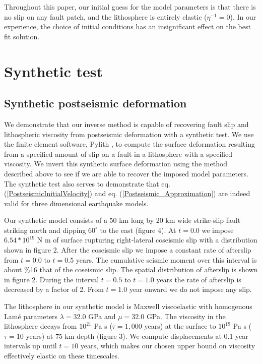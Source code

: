\documentclass[12pt]{article}
\begin{document}
Throughout this paper, our initial guess for the model parameters is
that there is no slip on any fault patch, and the lithosphere is
entirely elastic ($\eta^{-1} = 0$).  In our experience, the choice of
initial conditions has an insignificant effect on the best fit
solution.

\section{Synthetic test}
\subsection{Synthetic postseismic deformation}

We demonstrate that our inverse method is capable of recovering fault
slip and lithospheric viscosity from postseismic deformation with a
synthetic test.  We use the finite element software, Pylith
\citep{A2007}, to compute the surface deformation resulting from a
specified amount of slip on a fault in a lithosphere with a specified
viscosity.  We invert this synthetic surface deformation using the
method described above to see if we are able to recover the imposed
model parameters.  The synthetic test also serves to demonstrate that
eq. (\ref{PostseismicInitialVelocity}) and
eq. (\ref{Postseismic_Approximation}) are indeed valid for three
dimensional earthquake models.

Our synthetic model consists of a 50 km long by 20 km wide strike-slip
fault striking north and dipping $60^{\circ}$ to the east (figure
4). At $t=0.0$ we impose $6.54*10^{19}$ N m of
surface rupturing right-lateral coseismic slip with a distribution
shown in figure 2.  After the coseismic slip we impose a constant rate
of afterslip from $t=0.0$ to $t=0.5$ years.  The cumulative seismic
moment over this interval is about \%16 that of the coseismic slip.
The spatial distribution of afterslip is shown in figure 2.  During
the interval $t=0.5$ to $t=1.0$ years the rate of afterslip is
decreased by a factor of 2.  From $t=1.0$ year onward we do not impose any
slip.

The lithosphere in our synthetic model is Maxwell viscoelastic with
homogenous Lam\'e parameters $\lambda = 32.0$ GPa and $\mu = 32.0$
GPa.  The viscosity in the lithosphere decays from $10^{21}$ Pa s
($\tau=1,000$ years) at the surface to $10^{19}$ Pa s ($\tau=10$
years) at 75 km depth (figure 3).  We compute displacements at 0.1
year intervals up until $t=10$ years, which makes our chosen upper bound on
viscosity effectively elastic on these timescales.
\end{document}
